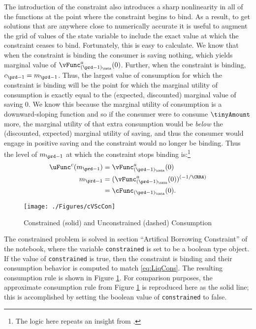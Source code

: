 The introduction of the constraint also introduces a sharp
nonlinearity in all of the functions at the point where the constraint
begins to bind.  As a result, to get solutions that are anywhere close
to numerically accurate it is useful to augment the grid of values of
the state variable to include the exact value at which the constraint
ceases to bind.  Fortunately, this is easy to calculate.  We know that
when the constraint is binding the consumer is saving nothing, which
yields marginal value of $\vFunc^{{a}}_{({\prd-1})_\cntn}(0)$. Further, when the
constraint is binding, ${c}_{\prd-1} = {m}_{\prd-1}$.  Thus, the largest
value of consumption for which the constraint is binding will be the
point for which the marginal utility of consumption is exactly equal
to the (expected, discounted) marginal value of saving 0.  We know
this because the marginal utility of consumption is a downward-sloping
function and so if the consumer were to consume $\tinyAmount$ more,
the marginal utility of that extra consumption would be \textit{below}
the (discounted, expected) marginal utility of saving, and thus the
consumer would engage in positive saving and the constraint would no
longer be binding.  Thus the level of ${m}_{\prd-1}$ at which the
constraint stops binding is:\footnote{The logic here repeats an insight from \cite{deatonLiqConstr}.}
\begin{equation}\begin{gathered}\begin{aligned}
      \uFunc^{{c}}({m}_{\prd-1})  & = \vFunc^{{a}}_{({\prd-1})_\cntn}(0)  \nonumber \\
      {m}_{\prd-1}  & = (\vFunc^{{a}}_{({\prd-1})_\cntn}(0))^{(-1/\CRRA)}  \nonumber
      \\        & = \cFunc_{({\prd-1})_\cntn}(0). \label{eq:LCbindsTm1}
    \end{aligned}\end{gathered}\end{equation}

\hypertarget{cVScCon}{}
\begin{figure}
  \texttt{[image: ./Figures/cVScCon]}
  \caption{Constrained (solid) and Unconstrained (dashed) Consumption}
  \label{fig:cVScCon}
\end{figure}

The constrained problem is solved in section ``Artifical Borrowing Constraint''
of the notebook, where the variable
\texttt{constrained} is set to be a boolean type object. If the value of \texttt{constrained}
is true, then the constraint is binding and their consumption behavior is computed to match
\eqref{eq:LiqCons}. The resulting consumption rule is shown in Figure \ref{fig:cVScCon}. For comparison purposes,
the approximate consumption rule from Figure \ref{fig:cVScCon} is
reproduced here as the solid line; this is accomplished by setting the boolean value
of \texttt{constrained} to false.


